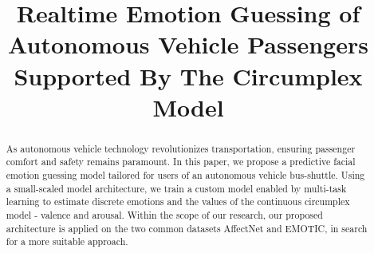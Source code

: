 \documentclass[conference]{IEEEtran}
\begin{document}
\title{Realtime Emotion Guessing of Autonomous Vehicle Passengers Supported By The Circumplex Model}

\author{
    \and
    \and
    \and
    \and
}
\maketitle

\begin{abstract}
    As autonomous vehicle technology revolutionizes transportation, ensuring passenger comfort and safety remains paramount. In this paper, we propose a predictive facial emotion guessing model tailored for users of an autonomous vehicle bus-shuttle. Using a small-scaled model architecture, we train a custom model enabled by 
    multi-task learning to estimate discrete emotions and the values of the continuous circumplex model - valence and arousal. Within the scope of our research, our proposed architecture is applied on the two common datasets AffectNet and EMOTIC, in search for a more suitable approach.
\end{abstract}
\end{document}
